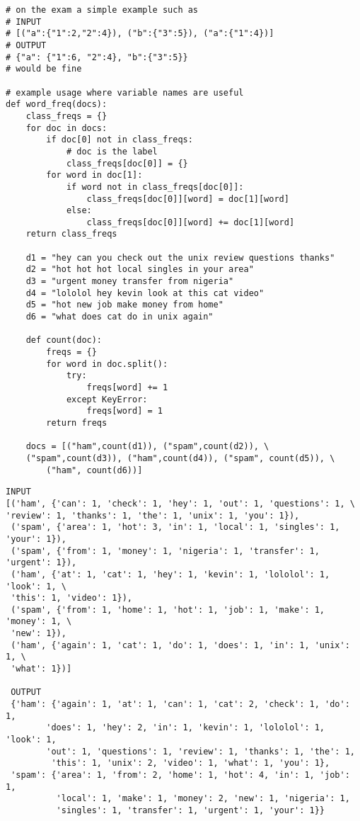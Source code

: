 \documentclass[11pt]{article}
\begin{document}
\begin{verbatim}
# on the exam a simple example such as 
# INPUT
# [("a":{"1":2,"2":4}), ("b":{"3":5}), ("a":{"1":4})]    
# OUTPUT
# {"a": {"1":6, "2":4}, "b":{"3":5}}
# would be fine

# example usage where variable names are useful
def word_freq(docs):
    class_freqs = {}
    for doc in docs:
        if doc[0] not in class_freqs:
            # doc is the label
            class_freqs[doc[0]] = {}
        for word in doc[1]:
            if word not in class_freqs[doc[0]]:
                class_freqs[doc[0]][word] = doc[1][word]
            else:
                class_freqs[doc[0]][word] += doc[1][word]
    return class_freqs
    
    d1 = "hey can you check out the unix review questions thanks"
    d2 = "hot hot hot local singles in your area"
    d3 = "urgent money transfer from nigeria"
    d4 = "lololol hey kevin look at this cat video"
    d5 = "hot new job make money from home"
    d6 = "what does cat do in unix again"
    
    def count(doc):
        freqs = {}
        for word in doc.split():
            try:
                freqs[word] += 1
            except KeyError:
                freqs[word] = 1
        return freqs
        
    docs = [("ham",count(d1)), ("spam",count(d2)), \
	("spam",count(d3)), ("ham",count(d4)), ("spam", count(d5)), \
		("ham", count(d6))]
\end{verbatim}
\begin{verbatim}
INPUT
[('ham', {'can': 1, 'check': 1, 'hey': 1, 'out': 1, 'questions': 1, \
'review': 1, 'thanks': 1, 'the': 1, 'unix': 1, 'you': 1}),
 ('spam', {'area': 1, 'hot': 3, 'in': 1, 'local': 1, 'singles': 1, 'your': 1}),
 ('spam', {'from': 1, 'money': 1, 'nigeria': 1, 'transfer': 1, 'urgent': 1}),
 ('ham', {'at': 1, 'cat': 1, 'hey': 1, 'kevin': 1, 'lololol': 1, 'look': 1, \ 
 'this': 1, 'video': 1}),
 ('spam', {'from': 1, 'home': 1, 'hot': 1, 'job': 1, 'make': 1, 'money': 1, \ 
 'new': 1}),
 ('ham', {'again': 1, 'cat': 1, 'do': 1, 'does': 1, 'in': 1, 'unix': 1, \
 'what': 1})]
 
 OUTPUT
 {'ham': {'again': 1, 'at': 1, 'can': 1, 'cat': 2, 'check': 1, 'do': 1,
        'does': 1, 'hey': 2, 'in': 1, 'kevin': 1, 'lololol': 1, 'look': 1,
        'out': 1, 'questions': 1, 'review': 1, 'thanks': 1, 'the': 1,
         'this': 1, 'unix': 2, 'video': 1, 'what': 1, 'you': 1},
 'spam': {'area': 1, 'from': 2, 'home': 1, 'hot': 4, 'in': 1, 'job': 1,
          'local': 1, 'make': 1, 'money': 2, 'new': 1, 'nigeria': 1,
          'singles': 1, 'transfer': 1, 'urgent': 1, 'your': 1}}
\end{verbatim}
\end{document}
